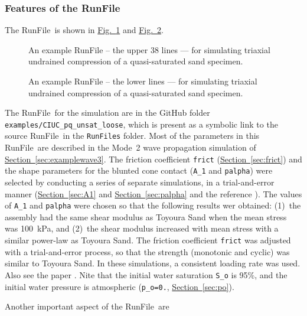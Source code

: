 \documentclass[letterpaper,11pt]{article}
\newcommand{\RunFile}{\textsf{RunFile}}
\begin{document}
\subsubsection{Features of the \RunFile}\label{sec:CIUCRunFile}
%
The \RunFile\ is shown in
\hyperref[fig:poro1]{Fig.~\ref*{fig:poro1}}
and
\hyperref[fig:poro2]{Fig.~\ref*{fig:poro2}}.
%
%
\begin{figure}
	\centering\footnotesize
	
	\caption{An example \textsf{RunFile} -- the upper 38 lines --- for simulating triaxial undrained compression of a quasi-saturated sand specimen.}
	\label{fig:poro1}
\end{figure}
%
\begin{figure}
	\centering\footnotesize
	
	\caption{An example \textsf{RunFile} -- the lower lines --- for simulating triaxial undrained compression of a quasi-saturated sand specimen.}
	\label{fig:poro2}
\end{figure}
%
The \RunFile\ for the simulation
are in the GitHub folder
\texttt{examples/CIUC\_pq\_unsat\_loose},
which is present as a symbolic link to the
source \RunFile\ in the \texttt{RunFiles} folder.
Most of the parameters in this \RunFile\ are
described in the Mode~2 wave propagation simulation of
\hyperref[sec:examplewave3]{Section~\ref*{sec:examplewave3}}.
The friction coefficient \texttt{frict}
(\hyperref[sec:frict]{Section~\ref*{sec:frict}})
and the shape parameters for the blunted cone contact
(\texttt{A\_1} and \texttt{palpha}) were selected 
by conducting a series of separate simulations,
in a trial-and-error manner
(\hyperref[sec:A1]{Section~\ref*{sec:A1}} and
\hyperref[sec:palpha]{Section~\ref*{sec:palpha}}
and the reference \cite{Kuhn:2014c}).
The values of \texttt{A\_1} and \texttt{palpha}
were chosen so that the following results wer
obtained: (1)~the assembly had the
same shear modulus as Toyoura Sand
when the mean stress was 100~kPa,
and (2)~the shear modulus increased with mean stress
with a similar power-law as Toyoura Sand.
The friction coefficient \texttt{frict}
was adjusted with a trial-and-error process,
so that the strength (monotonic and cyclic)
was similar to Toyoura Sand.
In these simulations, a consistent loading rate was used.
Also see the paper \cite{Kuhn:2021a}.
Nite that the initial water saturation
\texttt{S\_o} is 95\%,
and the initial water pressure is atmospheric
(\texttt{p\_o=0.}, \hyperref[sec:po]{Section~\ref*{sec:po}}).
%
\par
Another important aspect of the \RunFile\ are
\end{document}
